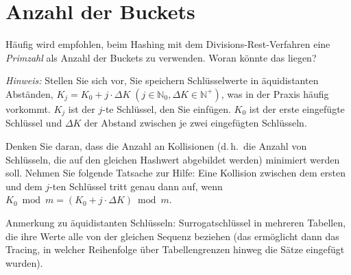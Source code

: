 \section{Anzahl der Buckets}
\label{sec:bucketanzahl}

Häufig wird empfohlen,
beim Hashing mit dem Divisions-Rest-Verfahren
eine \emph{Primzahl} als Anzahl der Buckets zu verwenden.
Woran könnte das liegen?

\emph{Hinweis:}
Stellen Sie sich vor, Sie speichern Schlüsselwerte in äquidistanten Abständen,
$K_j = K_0 + j \cdot \Delta K \; (j \in \mathbb{N}_0, \Delta K \in \mathbb{N}^+)$,
was in der Praxis häufig vorkommt.
$K_j$ ist der $j$-te Schlüssel, den Sie einfügen.
$K_0$ ist der erste eingefügte Schlüssel
und $\Delta K$ der Abstand zwischen je zwei eingefügten Schlüsseln.

Denken Sie daran, dass die Anzahl an Kollisionen (d.\,h.\ die Anzahl von Schlüsseln, die auf den gleichen Hashwert abgebildet werden) minimiert werden soll. Nehmen Sie folgende Tatsache zur Hilfe: Eine Kollision zwischen dem ersten und dem $j$-ten Schlüssel tritt genau dann auf, wenn $K_0 \bmod m = (K_0 + j \cdot \Delta K) \bmod m$.

\begin{note}
Anmerkung zu äquidistanten Schlüsseln: Surrogatschlüssel in mehreren Tabellen, die ihre Werte alle von der gleichen Sequenz beziehen (das ermöglicht dann das Tracing, in welcher Reihenfolge über Tabellengrenzen hinweg die Sätze eingefügt wurden).
\end{note}

